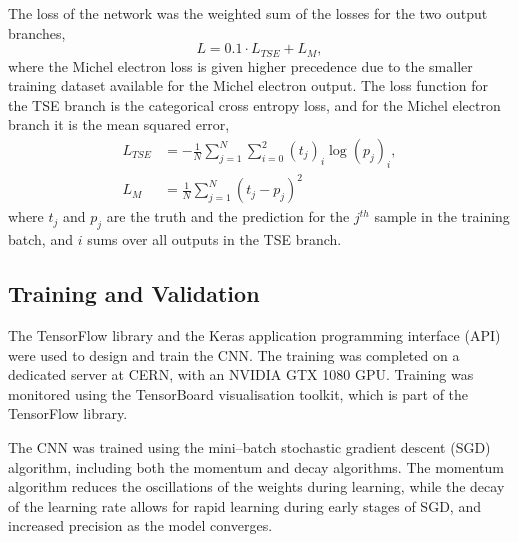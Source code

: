 The loss of the network was the weighted sum of the losses for the two output
branches,
\begin{equation*}
	L = 0.1 \cdot L_{TSE} + L_M,
\end{equation*}
where the Michel electron loss is given higher precedence due to the smaller
training dataset available for the Michel electron output. The loss function for
the TSE branch is the categorical cross entropy 
loss\cite{750fabedbacb467c8fafd98b87f77436}, and for the Michel electron branch
it is the mean squared error\cite{mse_springer},
\begin{align*}
	L_{TSE} &= - \frac{1}{N} \sum_{j=1}^N \sum_{i=0}^2 (t_j)_i \log (p_j)_i, \\
	L_M &= \frac{1}{N} \sum_{j=1}^N (t_j - p_j)^2
\end{align*}
where $t_j$ and $p_j$ are the truth and the prediction for the $j^{th}$ sample 
in the training batch, and $i$ sums over all outputs in the TSE branch. 

\subsection{Training and Validation}
The TensorFlow\cite{45381} library and the Keras\cite{chollet2015keras} 
application programming interface (API) were used to design and train the CNN. 
The training was completed on a dedicated \protodune{} server at CERN, with an 
NVIDIA GTX 1080 GPU. Training was monitored using the TensorBoard visualisation 
toolkit\cite{tensorboard}, which is part of the TensorFlow library. 

The CNN was trained using the mini--batch stochastic gradient descent (SGD)
algorithm, including both the momentum and decay algorithms\cite{Reed1999}. 
The momentum algorithm reduces the oscillations of the weights during 
learning, while the decay of the learning rate allows for rapid learning 
during early stages of SGD, and increased precision as the model converges. 

